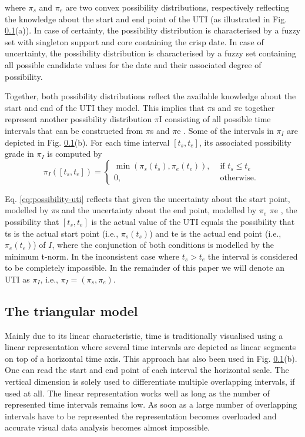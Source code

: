 where $\pi_s$ and $\pi_e$ are two convex possibility distributions, respectively reflecting the knowledge about the start and end point of the UTI (as illustrated in Fig. \ref{}(a)). In case of certainty, the possibility distribution is characterised by a fuzzy set with singleton support and core containing the crisp date. In case of uncertainty, the possibility distribution is characterised by a fuzzy set containing all possible candidate values for the date and their associated degree of possibility. 

Together, both possibility distributions reflect the available knowledge about the start and end of the UTI they model. This implies that $\pi$s and $\pi$e together represent another possibility distribution $\pi$I consisting of all possible time intervals that can be constructed from $\pi$s and $\pi$e . Some of the intervals in $\pi_I$ are depicted in Fig. \ref{}(b). For each time interval $\left[t_s , t_e \right]$, its associated possibility grade in $\pi_I$ is computed by
\begin{equation}
 \label{eq:possibility-uti}
\pi_{I} \left(\left[t_s, t_e\right] \right) = 
\begin{cases}
 \min \left(\pi_s (t_s), \pi_e (t_e) \right), & \mbox{ if } t_s \leq t_e\\
0, & \mbox{ otherwise. }
\end{cases}
\end{equation}

Eq. \eqref{eq:possibility-uti} reflects that given the uncertainty about the start point, modelled by $\pi$s and the uncertainty about the end point, modelled by $\pi_e$ $\pi$e , the possibility that $\left[t_s, t_e \right]$ is the actual value of the UTI equals the possibility that ts is the actual start point (i.e., $\pi_s (t_s)$) and te is the actual end point (i.e., $\pi_e (t_e)$) of $I$, where the conjunction of both conditions is modelled by the minimum t-norm. In the inconsistent case where $t_s > t_e$ the interval is considered to be completely impossible. In the remainder of this paper we will denote an UTI as $\pi_I$, i.e., $\pi_I = \left( \pi_s, \pi_e \right)$.



\subsection{\label{subsec:the-triangular-model}The triangular model}
Mainly due to its linear characteristic, time is traditionally visualised using a linear representation where several time intervals are depicted as linear segments on top of a horizontal time axis. This approach has also been used in Fig. \ref{}(b). One can read the start and end point of each interval the horizontal scale. The vertical dimension is solely used to differentiate multiple overlapping intervals, if used at all. The linear representation works well as long as the number of represented time intervals remains low. As soon as a large number of overlapping intervals have to be represented the representation becomes overloaded and accurate visual data analysis becomes almost impossible.

